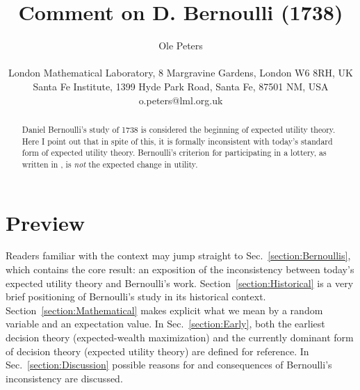 \documentclass[pdftex]{article}
\newcommand{\secref}[1]{Sec.~\ref{section:#1}}
\newcommand{\Secref}[1]{Section~\ref{section:#1}}
\begin{document}

\title{Comment on D. Bernoulli (1738)}
\author{Ole Peters\\
\\
{\small London Mathematical Laboratory, 8 Margravine Gardens, London W6 8RH, UK}\\
{\small Santa Fe Institute, 1399 Hyde Park Road, Santa Fe, 87501 NM, USA}\\
{\small o.peters@lml.org.uk}}
\maketitle


\begin{abstract}
Daniel Bernoulli's study of 1738 \cite{Bernoulli1738} is considered the beginning of expected utility theory. Here I point out that in spite of this, it is formally inconsistent with today's standard form of expected utility theory. Bernoulli's criterion for participating in a lottery, as written in \cite{Bernoulli1738}, is {\it not} the expected change in utility. 
\end{abstract}

\section{Preview}
Readers familiar with the context may jump straight to \secref{Bernoullis},  which contains the core result: an exposition of the inconsistency between today's expected utility theory and Bernoulli's work. \Secref{Historical} is a very brief positioning of Bernoulli's study in its historical context. \Secref{Mathematical} makes explicit what we mean by a random variable and an expectation value. In \secref{Early}, both the earliest decision theory (expected-wealth maximization) and the currently dominant form of decision theory (expected utility theory) are defined for reference. In \secref{Discussion} possible reasons for and consequences of Bernoulli's inconsistency are discussed.
 
\end{document}
